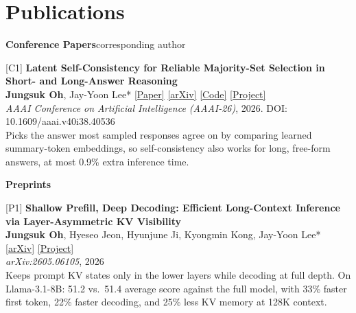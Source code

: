 \documentclass[10pt]{article}
\newcommand{\link}[2]{\href{#1}{\color{accent}#2}}
\newcommand{\sub}[1]{{\color{muted}#1}}
\begin{document}
\section{Publications}
\textbf{Conference Papers}\hfill\sub{\small * corresponding author}
\begin{pubs}
  \item[{[C1]}] \textbf{Latent Self-Consistency for Reliable Majority-Set Selection in Short- and Long-Answer Reasoning}\\
    \textbf{Jungsuk Oh}, Jay-Yoon Lee*\hfill
    \link{https://doi.org/10.1609/aaai.v40i38.40536}{[Paper]}
    \link{https://arxiv.org/abs/2508.18395}{[arXiv]}
    \link{https://github.com/jeongseokO/LatentSC}{[Code]}
    \link{https://jeongseoko.github.io/research/lsc/}{[Project]}\\
    \textit{AAAI Conference on Artificial Intelligence (AAAI-26)}, 2026. DOI: 10.1609/aaai.v40i38.40536\\
    \sub{Picks the answer most sampled responses agree on by comparing learned summary-token embeddings, so self-consistency also works for long, free-form answers, at most 0.9\% extra inference time.}
\end{pubs}
\textbf{Preprints}
\begin{pubs}
  \item[{[P1]}] \textbf{Shallow Prefill, Deep Decoding: Efficient Long-Context Inference via Layer-Asymmetric KV Visibility}\\
    \textbf{Jungsuk Oh}, Hyeseo Jeon, Hyunjune Ji, Kyongmin Kong, Jay-Yoon Lee*\hfill
    \link{https://arxiv.org/abs/2605.06105}{[arXiv]}
    \link{https://jeongseoko.github.io/research/speed/}{[Project]}\\
    \textit{arXiv:2605.06105}, 2026\\
    \sub{Keeps prompt KV states only in the lower layers while decoding at full depth. On Llama-3.1-8B: 51.2 vs.\ 51.4 average score against the full model, with 33\% faster first token, 22\% faster decoding, and 25\% less KV memory at 128K context.}
\end{pubs}

\end{document}

